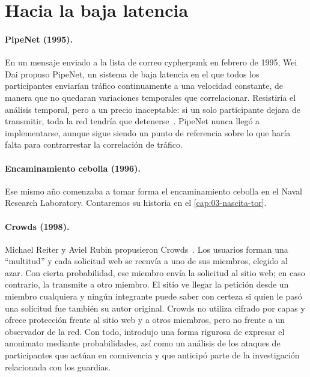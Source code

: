 \section{Hacia la baja latencia}\label{sec:radici-bassa}

\paragraph{PipeNet (1995).} En un mensaje enviado a la lista de correo cypherpunk en febrero de 1995, Wei Dai propuso PipeNet, un sistema de baja latencia en el que todos los participantes enviarían tráfico continuamente a una velocidad constante, de manera que no quedaran variaciones temporales que correlacionar. Resistiría el análisis temporal, pero a un precio inaceptable: si un solo participante dejara de transmitir, toda la red tendría que detenerse~\cite{syverson2011peel}. PipeNet nunca llegó a implementarse, aunque sigue siendo un punto de referencia sobre lo que haría falta para contrarrestar la correlación de tráfico.

\paragraph{Encaminamiento cebolla (1996).} Ese mismo año comenzaba a tomar forma el encaminamiento cebolla en el Naval Research Laboratory. Contaremos su historia en el \cref{cap:03-nascita-tor}.

\paragraph{Crowds (1998).} Michael Reiter y Aviel Rubin propusieron Crowds~\cite{reiter1998crowds}. Los usuarios forman una \enquote{multitud} y cada solicitud web se reenvía a uno de sus miembros, elegido al azar. Con cierta probabilidad, ese miembro envía la solicitud al sitio web; en caso contrario, la transmite a otro miembro. El sitio ve llegar la petición desde un miembro cualquiera y ningún integrante puede saber con certeza si quien le pasó una solicitud fue también su autor original. Crowds no utiliza cifrado por capas y ofrece protección frente al sitio web y a otros miembros, pero no frente a un observador de la red. Con todo, introdujo una forma rigurosa de expresar el anonimato mediante probabilidades, así como un análisis de los ataques de participantes que actúan en connivencia y que anticipó parte de la investigación relacionada con los guardias.

